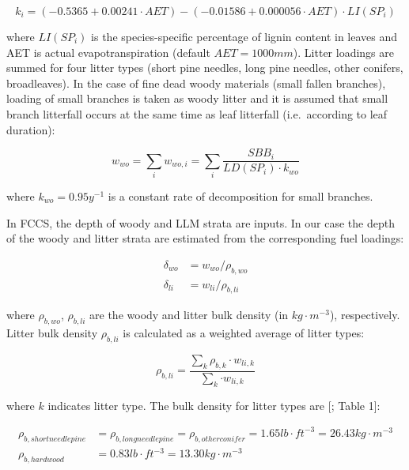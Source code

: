 \documentclass[]{book}
\begin{document}
\begin{equation}
k_i = (-0.5365+0.00241\cdot AET) - (-0.01586+0.000056\cdot AET) \cdot LI(SP_i) 
\end{equation}

where \(LI(SP_i)\) is the species-specific percentage of lignin content
in leaves and AET is actual evapotranspiration (default
\(AET = 1000 mm\)). Litter loadings are summed for four litter types
(short pine needles, long pine needles, other conifers, broadleaves). In
the case of fine dead woody materials (small fallen branches), loading
of small branches is taken as woody litter and it is assumed that small
branch litterfall occurs at the same time as leaf litterfall
(i.e.~according to leaf duration):

\begin{equation}
w_{wo} = \sum_{i}{w_{wo, i}} = \sum_{i}{\frac{SBB_i}{LD(SP_i)\cdot k_{wo}} }
\end{equation}

where \(k_{wo} = 0.95 y^{-1}\) is a constant rate of decomposition for
small branches.

In FCCS, the depth of woody and LLM strata are inputs. In our case the
depth of the woody and litter strata are estimated from the
corresponding fuel loadings:

\begin{eqnarray}
\delta_{wo} &= w_{wo}/\rho_{b, wo}\\
\delta_{li} &= w_{li}/\rho_{b, li}
\end{eqnarray}

where \(\rho_{b, wo}\), \(\rho_{b, li}\) are the woody and litter bulk
density (in \(kg\cdot m^{-3}\)), respectively. Litter bulk density
\(\rho_{b,li}\) is calculated as a weighted average of litter types:

\begin{equation}
 \rho_{b,li} = \frac{\sum_{k}{ \rho_{b,k}\cdot w_{li,k}}}{\sum_{k} {\cdot w_{li,k}}}
\end{equation}

where \(k\) indicates litter type. The bulk density for litter types are
{[}\citet{Prichard2013}; Table 1{]}:

\begin{eqnarray}
\rho_{b,shortneedlepine} &= \rho_{b,longneedlepine} = \rho_{b,otherconifer}= 1.65 lb\cdot ft^{-3} = 26.43 kg\cdot m^{-3}\\
\rho_{b,hardwood} &= 0.83 lb\cdot ft^{-3} = 13.30  kg\cdot m^{-3}
\end{eqnarray}
\end{document}
